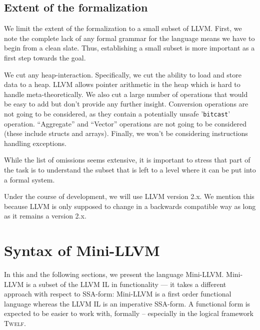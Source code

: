 \documentclass[a4paper, oneside, 10pt, final]{memoir}
\newcommand{\twelf}{\textsc{Twelf}}
\begin{document}
\section{Extent of the formalization}

We limit the extent of the formalization to a small subset of
LLVM. First, we note the complete lack of any formal grammar for
the language means we have to begin from a clean slate. Thus,
establishing a small subset is more important as a first step towards
the goal.

We cut any heap-interaction. Specifically, we cut the ability to
load and store data to a heap. LLVM allows pointer arithmetic in the
heap which is hard to handle meta-theoretically. We also cut a large
number of operations that would be easy to add but don't provide
any further insight. Conversion operations are not going to be
considered, as they contain a potentially unsafe '\texttt{bitcast}'
operation. ``Aggregate'' and ``Vector'' operations are not going to be
considered (these include structs and arrays). Finally, we won't be
considering instructions handling exceptions.

While the list of omissions seems extensive, it is important to stress
that part of the task is to understand the subset that is left to a
level where it can be put into a formal system.

Under the course of development, we will use LLVM version 2.x. We
mention this because LLVM is only supposed to change in a backwards
compatible way as long as it remains a version 2.x.

\chapter{Syntax of Mini-LLVM}

\newcommand{\variables}{\mathrm{Variables}}
\newcommand{\BBlabels}{\mathrm{Labels}}
\newcommand{\tnat}{\mathbf{nat}}
\newcommand{\tbool}{\mathbf{bool}}
\newcommand{\types}{\mathrm{Types}}
\newcommand{\typelist}{\mathrm{Type lists}}
\newcommand{\bbtype}{\mathrm{Label Type}}
\newcommand{\ftype}{\mathrm{Fun Contexts}}
\newcommand{\tpenv}{\mathrm{Var Contexts}}
\newcommand{\bbenv}{\mathrm{Label Contexts}}
\newcommand{\bor}{\; \vert \;}
\newcommand{\ntypes}{\tau_1 \times \tau_2 \times \dotsb \times \tau_n}
\newcommand{\ntypesp}{\tau'_1 \times \tau'_2 \times \dotsb \times
  \tau'_n}
\newcommand{\ntypespp}{\tau_1 \times \tau_2 \times \dotsb \times \tau_{n'}}
In this and the following sections, we present the language
Mini-LLVM. Mini-LLVM is a subset of the LLVM IL in functionality ---
it takes a different approach with respect to SSA-form: Mini-LLVM is a
first order functional language whereas the LLVM IL is an imperative
SSA-form. A functional form is expected to be easier to work with,
formally -- especially in the logical framework \twelf{}.
\end{document}
